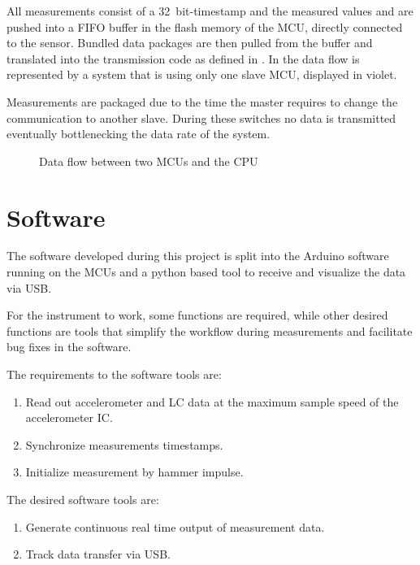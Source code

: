All measurements consist of a \SI{32}{bit}-timestamp and the measured values and are pushed into a \ac{FIFO} buffer in the flash memory of the \ac{MCU}, directly connected to the sensor. Bundled data packages are then pulled from the buffer and translated into the transmission code as defined in . In  the data flow is represented by a system that is using only one slave \ac{MCU}, displayed in violet.

Measurements are packaged due to the time the master requires to change the communication to another slave. During these switches no data is transmitted eventually bottlenecking the data rate of the system.

\begin{figure}[!htb]
    \centering
    
    \caption[Data flow]{Data flow between two \ac{MCU}s and the CPU}
    \label{fig:data_flow}
\end{figure}

\section{Software}

The software developed during this project is split into the Arduino software running on the \acs{MCU}s and a python based tool to receive and visualize the data via \ac{USB}.

For the instrument to work, some functions are required, while other desired functions are tools that simplify the workflow during measurements and facilitate bug fixes in the software.

The requirements to the software tools are:
\begin{enumerate}[label=\emph{m\arabic*}, itemindent=3em, labelsep=2em]
    \item Read out accelerometer and \ac{LC} data at the maximum sample speed of the accelerometer \ac{IC}.\label{req:read_out}
    \item Synchronize measurements timestamps.\label{req:sync}
    \item Initialize measurement by hammer impulse.\label{req:init}
\end{enumerate}

The desired software tools are:
\begin{enumerate}[label=\emph{w\arabic*}, itemindent=3em, labelsep=2em]
    \item Generate continuous real time output of measurement data.\label{des:cont_out}
    \item Track data transfer via \ac{USB}.\label{des:dat_track}
\end{enumerate}


